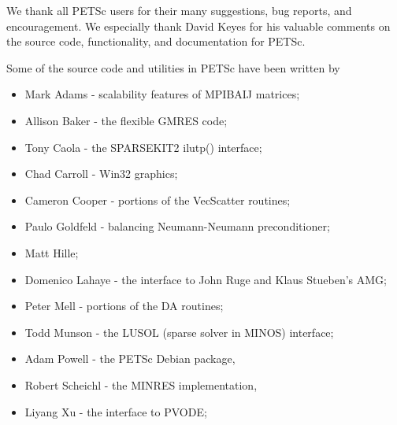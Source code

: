 %
%

\medskip \medskip \noindent
We thank all PETSc users for their many suggestions, bug reports, and
encouragement.  We especially thank David Keyes
for his valuable comments on the source code,
functionality, and documentation for PETSc.


\vspace{.3in}
\noindent
Some of the source code and utilities in PETSc
have been written by 
\begin{itemize}
  \item Mark Adams - scalability features of MPIBAIJ matrices;
  \item Allison Baker - the flexible GMRES code;
  \item Tony Caola - the SPARSEKIT2 ilutp() interface;
  \item Chad Carroll - Win32 graphics;
  \item Cameron Cooper - portions of the VecScatter routines;
  \item Paulo Goldfeld - balancing Neumann-Neumann preconditioner;
  \item Matt Hille;
  \item Domenico Lahaye - the interface to John Ruge and Klaus Stueben's AMG;
  \item Peter Mell - portions of the DA routines;
  \item Todd Munson - the LUSOL (sparse solver in MINOS) interface;
  \item Adam Powell - the PETSc Debian package, 
  \item Robert Scheichl - the MINRES implementation,
  \item Liyang Xu - the interface to PVODE;
\end{itemize}


